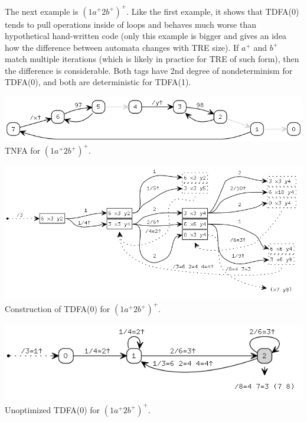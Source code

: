 \documentclass{article}
\theoremstyle{definition}
\begin{document}
\begin{multicols}{2}
The next example is $(1 a^+ 2 b^+)^+$.
Like the first example, it shows that TDFA(0) tends to pull operations inside of loops
and behaves much worse than hypothetical hand-written code
(only this example is bigger and gives an idea how the difference between automata changes with TRE size).
If $a^+$ and $b^+$ match multiple iterations (which is likely in practice for TRE of such form), then the difference is considerable.
Both tags have 2nd degree of nondeterminism for TDFA(0), and both are deterministic for TDFA(1).
\begin{center}
\includegraphics[width=\linewidth]{img/example5/tnfa.png}\\
\footnotesize{TNFA for $(1 a^+ 2 b^+)^+$.} \\
\end{center}
\begin{center}
\includegraphics[width=\linewidth]{img/example5/tdfa0_raw.png}\\
\footnotesize{Construction of TDFA(0) for $(1 a^+ 2 b^+)^+$.} \\
\end{center}
\begin{center}
\includegraphics[width=\linewidth]{img/example5/tdfa0.png}\\
\footnotesize{Unoptimized TDFA(0) for $(1 a^+ 2 b^+)^+$.} \\

\end{center}
\end{multicols}
\end{document}
